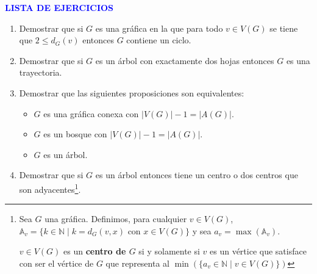 \documentclass[10pt]{report}
\numberwithin{section}{chapter}
\begin{document}
\vspace{1cm}


\begin{center}
\textcolor{blue}{\textbf{\large LISTA DE EJERCICIOS}}
\end{center}


\begin{enumerate}
\item Demostrar que si $G$ es una gráfica en la que para todo $v \in V(G)$ se tiene que $ 2 \leq d_G(v)$ entonces $G$ contiene un ciclo.


\item Demostrar que si $G$ es un árbol con exactamente dos hojas entonces $G$ es una trayectoria.


\item Demostrar que las siguientes proposiciones son equivalentes:
\begin{itemize}
\item $G$ es una gráfica conexa con $|V(G)|-1 = |A(G)|$.
\item $G$ es un bosque con $|V(G)|-1 = |A(G)|$.
\item $G$ es un árbol.
\end{itemize}


\item Demostrar que si $G$ es un árbol entonces tiene un centro o dos centros que son adyacentes\footnote{Sea $G$ una gráfica. Definimos, para cualquier $v \in V(G)$, $\mathbb{A}_v = \{ k \in \mathbb N \; | \; k = d_G(v,x) \text{ con } x \in V(G)\}$ y sea $a_v = \max(\mathbb A_v)$.

$v \in V(G)$ es un \textbf{centro de $G$} si y solamente si $v$ es un vértice que satisface con ser el vértice de $G$ que representa al $\min(\{ a_v \in \mathbb N \; | \; v \in V(G) \})$}.



\end{enumerate}
\end{document}
